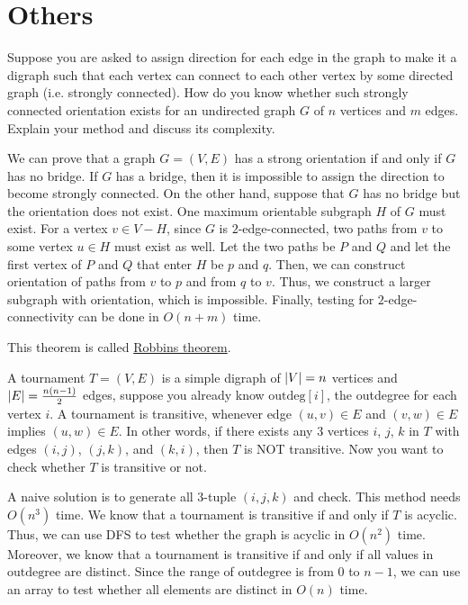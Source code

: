 \section{Others}
\begin{Exercise}[title={Strong orientation},origin={NCKU IM 99}]
Suppose you are asked to assign direction for each edge in the graph to make it a digraph such that each vertex can connect to each other vertex by some directed graph (i.e. strongly connected). How do you know whether such strongly connected orientation exists for an undirected graph $G$ of $n$ vertices and $m$ edges. Explain your method and discuss its complexity.
\end{Exercise}
\begin{Answer}
We can prove that a graph $G = (V, E)$ has a strong orientation if and only if $G$ has no bridge. If $G$ has a bridge, then it is impossible to assign the direction to become strongly connected. On the other hand, suppose that $G$ has no bridge but the orientation does not exist. One maximum orientable subgraph $H$ of $G$ must exist. For a vertex $v \in V - H$, since $G$ is $2$-edge-connected, two paths from $v$ to some vertex $u \in H$ must exist as well. Let the two paths be $P$ and $Q$ and let the first vertex of $P$ and $Q$ that enter $H$ be $p$ and $q$. Then, we can construct orientation of paths from $v$ to $p$ and from $q$ to $v$. Thus, we construct a larger subgraph with orientation, which is impossible. Finally, testing for $2$-edge-connectivity can be done in $O(n + m)$ time.
\begin{remark} This theorem is called \href{https://en.wikipedia.org/wiki/Robbins%27_theorem}{Robbins theorem}.
\end{remark}
\end{Answer}

\begin{Exercise}[origin={NCKU CSIE 100}]
A tournament $T = (V, E)$ is a simple digraph of $\lvert V\rvert = n$ vertices and $\lvert E\rvert = \frac{n(n-1)}{2}$ edges, suppose you already know $\text{outdeg}[i]$, the outdegree for each vertex $i$. A tournament is transitive, whenever edge $(u, v) \in E$ and $(v, w) \in E$ implies $(u, w) \in E$. In other words, if there exists any $3$ vertices $i$, $j$, $k$ in $T$ with edges $(i, j)$, $(j, k)$, and $(k, i)$, then $T$ is NOT transitive. Now you want to check whether $T$ is transitive or not.
\end{Exercise}
\begin{Answer}
A naive solution is to generate all $3$-tuple $(i, j, k)$ and check. This method needs $O(n^3)$ time. We know that a tournament is transitive if and only if $T$ is acyclic. Thus, we can use DFS to test whether the graph is acyclic in $O(n^2)$ time. Moreover, we know that a tournament is transitive if and only if all values in $\text{outdegree}$ are distinct. Since the range of $\text{outdegree}$ is from $0$ to $n-1$, we can use an array to test whether all elements are distinct in $O(n)$ time.
\end{Answer}


